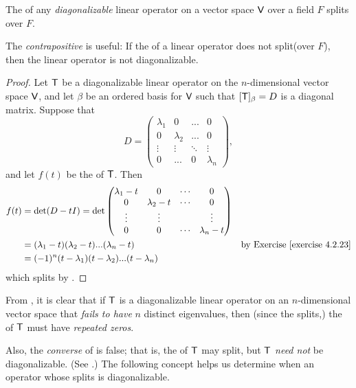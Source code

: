 \begin{theorem} \label{thm 5.6}
The \CPOLY{} of any \emph{diagonalizable} linear operator on a vector space \(\textsf{V}\) over a field \(F\) splits over \(F\).
\end{theorem}

\begin{note}
The \emph{contrapositive} is useful: If the \CPOLY{} of a linear operator does not split(over \(F\)), then the linear operator is not diagonalizable.
\end{note}

\begin{proof}
Let \(\textsf{T}\) be a diagonalizable linear operator on the \(n\)-dimensional vector space \(\textsf{V}\), and let \(\beta\) be an ordered basis for \(\textsf{V}\) such that \([\textsf{T}]_{\beta} = D\) is a diagonal matrix.
Suppose that
\[
    D = \begin{pmatrix}
        \lambda_1 & 0         & ...    & 0 \\
        0         & \lambda_2 & ...    & 0 \\
        \vdots    & \vdots    & \ddots & \vdots \\
        0         & ...       & 0      & \lambda_n
    \end{pmatrix},
\]
and let \(f(t)\) be the \CPOLY{} of \(\textsf{T}\).
Then
\begin{align*}
    f(t) & = \det(D - tI) = \det \begin{pmatrix}
                \lambda_{1}-t & 0 & \cdots & 0 \\
                0 & \lambda_{2}-t & \cdots & 0 \\
                \vdots & \vdots & & \vdots \\
                0 & 0 & \cdots & \lambda_{n}-t
            \end{pmatrix} \\
         & = (\lambda_1 - t)(\lambda_2 - t) ... (\lambda_n - t) & \text{by \EXEC{4.2.23}} \\
         & = (-1)^n (t - \lambda_1)(t - \lambda_2) ... (t - \lambda_n)
\end{align*}
which splits by .
\end{proof}

\begin{remark} \label{remark 5.2.3}
From , it is clear that if \(\textsf{T}\) is a diagonalizable linear operator on an \(n\)-dimensional vector space that \emph{fails to have} \(n\) distinct eigenvalues, then (since the \CPOLY{} splits,) the \CPOLY{} of \(\textsf{T}\) must have \emph{repeated zeros}.

Also, the \emph{converse} of  is false;
that is, the \CPOLY{} of \(\textsf{T}\) may split, but \(\textsf{T}\) \emph{need not} be diagonalizable.
(See .)
The following concept helps us determine when an operator whose \CPOLY{} splits is diagonalizable.
\end{remark}

